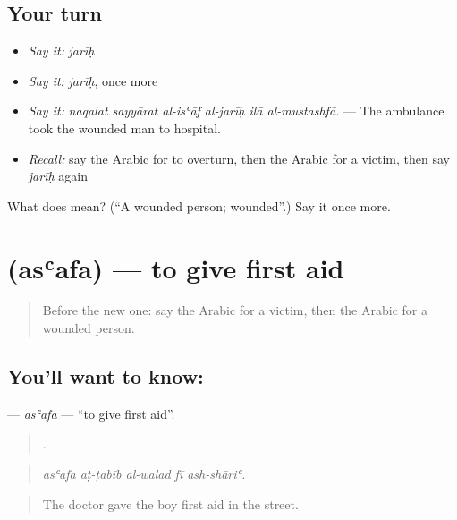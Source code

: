 \subsection*{Your turn}
\begin{itemize}
\raggedright
  \item \emph{Say it:} \emph{jarīḥ}
  \item \emph{Say it:} \emph{jarīḥ}, once more
  \item \emph{Say it:} \emph{naqalat sayyārat al-isʿāf al-jarīḥ ilā al-mustashfā.} — The ambulance took the wounded man to hospital.
  \item \emph{Recall:} say the Arabic for to overturn, then the Arabic for a victim, then say \emph{jarīḥ} again
\end{itemize}

\begin{tcolorbox}[breakable,colback=teal!4,colframe=teal!35!black,title={Before you move on}]
What does  mean? (\textquotedblleft{}A wounded person; wounded\textquotedblright{}.) Say it once more.
\end{tcolorbox}
\section[\texorpdfstring{\ar{أسعف} (asʿafa)}{أسعف (asʿafa)}]{ (asʿafa) — to give first aid}

\label{lesson:AR-C301-asafa-aid}



\begin{quote}
Before the new one: say the Arabic for a victim, then the Arabic for a wounded person.
\end{quote}

\subsection*{You'll want to know: }
\textbf{} — \emph{asʿafa} — \textquotedblleft{}to give first aid\textquotedblright{}.

\begin{quote}
    .
\end{quote}

\begin{quote}
\emph{asʿafa aṭ-ṭabīb al-walad fī ash-shāriʿ.}
\end{quote}

\begin{quote}
The doctor gave the boy first aid in the street.
\end{quote}

